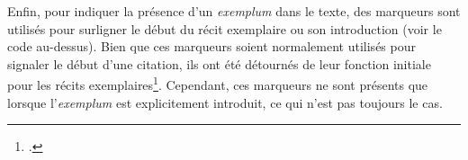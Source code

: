Enfin, pour indiquer la présence d'un \textit{exemplum} dans le texte, des marqueurs sont utilisés pour surligner le début du récit exemplaire ou son introduction (voir le code au-dessus). Bien que ces marqueurs soient normalement utilisés pour signaler le début d'une citation, ils ont été détournés de leur fonction initiale pour les récits exemplaires\footcite{SourcEncyMe}. Cependant, ces marqueurs ne sont présents que lorsque l'\textit{exemplum} est explicitement introduit, ce qui n'est pas toujours le cas.